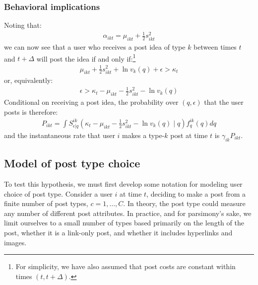 \subsubsection*{Behavioral implications}

Noting that:
\begin{align}
\alpha_{ikt} = \mu_{ikt} + \tfrac{1}{2} s_{ikt}^2
\end{align}
we can now see that a user who receives a post idea of type $k$ between times $t$ and $t+\Delta$ will post the idea if and only if:\footnote{For simplicity, we have also assumed that post costs are constant within times $(t, t+\Delta)$.}
\begin{align}
\mu_{ikt} + \tfrac{1}{2} s_{ikt}^2 + \ln v_k (q) + \epsilon > \kappa_t
\end{align}
or, equivalently:
\begin{align}
\epsilon > \kappa_t - \mu_{ikt} - \tfrac{1}{2} s_{ikt}^2 - \ln v_k (q)
\end{align}
Conditional on receiving a post idea, the probability over $(q,\epsilon)$ that the user posts is therefore:
\begin{align}
P_{ikt} = \int S_{\epsilon|q}^{ik}\left(\kappa_t - \mu_{ikt} - \tfrac{1}{2}s_{ikt}^2 - \ln v_k (q) \mid q \right) f^{ik}_q(q)dq
\end{align}
and the instantaneous rate that user $i$ makes a type-$k$ post at time $t$ is $\gamma_{ik} P_{ikt}$.






\subsection{Model of post type choice} \label{sec_v4v_model}

To test this hypothesis, we must first develop some notation for modeling user choice of post type. Consider a user $i$ at time $t$, deciding to make a post from a finite number of post types, $c = 1,\ldots,C$. In theory, the post type could measure any number of different post attributes. In practice, and for parsimony's sake, we limit ourselves to a small number of types based primarily on the length of the post, whether it is a link-only post, and whether it includes hyperlinks and images.

